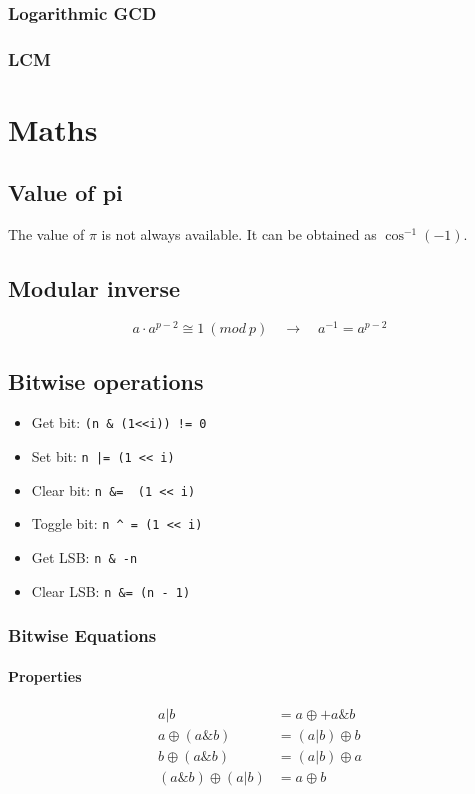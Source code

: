 \documentclass[a4paper,10pt,twocolumn, titlepage]{article}
\begin{document}
\subsubsection{Logarithmic GCD}



\subsubsection{LCM}



\section{Maths}
\subsection{Value of pi}
The value of $\pi$ is not always available. It can be obtained as $\cos^{-1}(-1)$.
\subsection{Modular inverse}
$$
a\cdot a^{p-2} \cong 1 ~ (mod~ p) \quad\rightarrow\quad a^{-1} = a^{p-2}
$$

\subsection{Bitwise operations}
\begin{itemize}
 \item Get bit: \texttt{(n \& (1<<i)) != 0}
 \item Set bit: \texttt{n |= (1 << i)}
 \item Clear bit: \texttt{n \&= ~(1 << i)}
 \item Toggle bit: \texttt{n \^{} = (1 << i)}
 \item Get LSB: \texttt{n \& -n}
 \item Clear LSB: \texttt{n \&= (n - 1)}
\end{itemize}


\subsubsection{Bitwise Equations}

\paragraph{Properties}
$$
\begin{array}{rl}
a | b &= a \oplus + a \& b \\
a \oplus (a \& b) &= (a|b)\oplus b \\
b \oplus (a \& b) &= (a | b)\oplus a \\
(a \& b) \oplus (a|b) &= a\oplus b
\end{array}
$$
\end{document}
